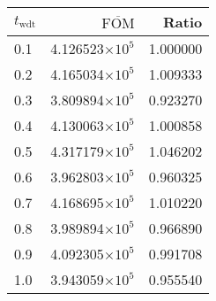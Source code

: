 \begin{tabular}{lrr}
\toprule
$t_{\mathrm{wdt}}$ & $\overline{\mathrm{FOM}}$ &    Ratio \\
\midrule
               0.1 &   4.126523$\times 10^{5}$ & 1.000000 \\
               0.2 &   4.165034$\times 10^{5}$ & 1.009333 \\
               0.3 &   3.809894$\times 10^{5}$ & 0.923270 \\
               0.4 &   4.130063$\times 10^{5}$ & 1.000858 \\
               0.5 &   4.317179$\times 10^{5}$ & 1.046202 \\
               0.6 &   3.962803$\times 10^{5}$ & 0.960325 \\
               0.7 &   4.168695$\times 10^{5}$ & 1.010220 \\
               0.8 &   3.989894$\times 10^{5}$ & 0.966890 \\
               0.9 &   4.092305$\times 10^{5}$ & 0.991708 \\
               1.0 &   3.943059$\times 10^{5}$ & 0.955540 \\
\bottomrule
\end{tabular}
